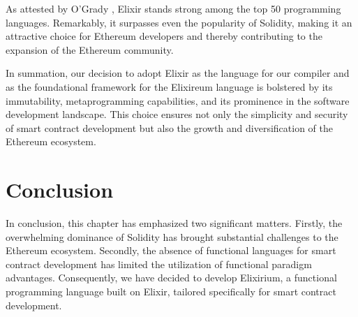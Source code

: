 As attested by O'Grady \cite{RedMonk}, Elixir stands strong among the top 50 programming languages. Remarkably, it surpasses even the popularity of Solidity, making it an attractive choice for Ethereum developers and thereby contributing to the expansion of the Ethereum community.

In summation, our decision to adopt Elixir as the language for our compiler and as the foundational framework for the Elixireum language is bolstered by its immutability, metaprogramming capabilities, and its prominence in the software development landscape. This choice ensures not only the simplicity and security of smart contract development but also the growth and diversification of the Ethereum ecosystem.

\section{Conclusion}
\label{sec:conc}

In conclusion, this chapter has emphasized two significant matters. Firstly, the overwhelming dominance of Solidity has brought substantial challenges to the Ethereum ecosystem. Secondly, the absence of functional languages for smart contract development has limited the utilization of functional paradigm advantages. Consequently, we have decided to develop Elixirium, a functional programming language built on Elixir, tailored specifically for smart contract development.
